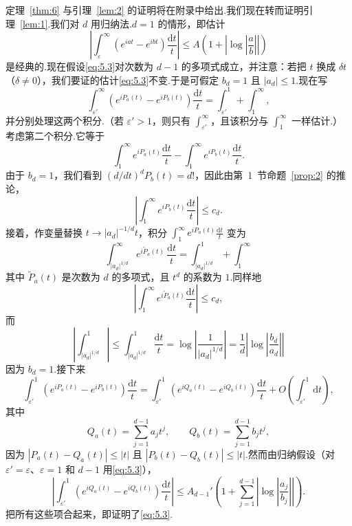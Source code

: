 \documentclass[
  BookTitleCN={傅里叶分析中的振动积分},
  BookTitleEN={Oscillatory Integrals in Fourier Analysis},
  OriginalAuthor={E.~M. Stein},
  OriginalEdition={Proc. Sympos. Pure Math. 35, Part~1},
  OriginalPublisher={American Mathematical Society},
  OriginalYear={1979},
  Translator={翻译及重排},
  ModelUsed={Codex CLI},
  Biblatex=false,
  TranslationDate={2026年8月27日}
]{mathtranslation}
\numberwithin{equation}{chapter}   %
\begin{document}
\noindent 定理~\ref{thm:6} 与引理~\ref{lem:2} 的证明将在附录中给出.我们现在转而证明引理~\ref{lem:1}.我们对 $d$ 用归纳法.$d=1$ 的情形，即估计
\[
  \left|\int_{\varepsilon}^{\infty}\left(e^{iat}-e^{ibt}\right)\frac{\mathrm{d}t}{t}\right|\leq A\left(1+\left|\log\left|\frac{a}{b}\right|\right|\right)
\]
是经典的.现在假设\eqref{eq:5.3}对次数为 $d-1$ 的多项式成立，并注意：若把 $t$ 换成 $\delta t$（$\delta\neq0$），我们要证的估计\eqref{eq:5.3}不变.于是可假定 $b_{d}=1$ 且 $|a_{d}|\leq1$.现在写
\[
  \int_{\varepsilon'}^{\infty}\left(e^{iP_{a}(t)}-e^{iP_{b}(t)}\right)\frac{\mathrm{d}t}{t} = \int_{\varepsilon'}^{1} + \int_{1}^{\infty},
\]
并分别处理这两个积分.（若 $\varepsilon'>1$，则只有 $\int_{\varepsilon'}^{\infty}$，且该积分与 $\int_{1}^{\infty}$ 一样估计.）考虑第二个积分.它等于
\[
  \int_{1}^{\infty}e^{iP_{a}(t)}\frac{\mathrm{d}t}{t} - \int_{1}^{\infty}e^{iP_{b}(t)}\frac{\mathrm{d}t}{t} .
\]
由于 $b_{d}=1$，我们看到 $(d/dt)^{d}P_{b}(t)=d!$，因此由第~1~节命题~\ref{prop:2} 的推论，
\[
  \left|\int_{1}^{\infty}e^{iP_{b}(t)}\frac{\mathrm{d}t}{t}\right|\leq c_{d} .
\]
接着，作变量替换 $t\to|a_{d}|^{-1/d}t$，积分 $\int_{1}^{\infty}e^{iP_{a}(t)}\frac{\mathrm{d}t}{t}$ 变为
\[
  \int_{|a_{d}|^{1/d}}^{\infty}e^{i\widetilde{P}_{a}(t)}\,\frac{\mathrm{d}t}{t} = \int_{|a_{d}|^{1/d}}^{1} + \int_{1}^{\infty}
\]
其中 $\widetilde{P}_{a}(t)$ 是次数为 $d$ 的多项式，且 $t^{d}$ 的系数为 $1$.同样地
\[
  \left|\int_{1}^{\infty}e^{i\widetilde{P}_{a}(t)}\frac{\mathrm{d}t}{t}\right|\leq c_{d},
\]
而
\[
  \left|\int_{|a_{d}|^{1/d}}^{1}\right|\leq\int_{|a_{d}|^{1/d}}^{1}\frac{\mathrm{d}t}{t}=\log\left|\frac{1}{|a_d|^{1/d}}\right|=\frac{1}{d}\left|\log\left|\frac{b_{d}}{a_{d}}\right|\right|
\]
因为 $b_{d}=1$.接下来
\[
  \int_{\varepsilon'}^{1}\left(e^{iP_{a}(t)}-e^{iP_{b}(t)}\right)\frac{\mathrm{d}t}{t} = \int_{\varepsilon'}^{1}\left(e^{iQ_{a}(t)}-e^{iQ_{b}(t)}\right)\frac{\mathrm{d}t}{t} + O\left(\int_{\varepsilon'}^{1}\mathrm{d}t\right),
\]
其中
\[
  Q_{a}(t)=\sum_{j=1}^{d-1}a_{j}t^{j},\qquad Q_{b}(t)=\sum_{j=1}^{d-1}b_{j}t^{j},
\]
因为 $|P_{a}(t)-Q_{a}(t)|\leq|t|$ 且 $|P_{b}(t)-Q_{b}(t)|\leq|t|$.然而由归纳假设（对 $\varepsilon'=\varepsilon$、$\varepsilon=1$ 和 $d-1$ 用\eqref{eq:5.3}），
\[
  \left|\int_{\varepsilon'}^{1}\left(e^{iQ_{a}(t)}-e^{iQ_{b}(t)}\right)\frac{\mathrm{d}t}{t}\right|\leq A_{d-1}'\left(1+\sum_{j=1}^{d-1}\left|\log\left|\frac{a_{j}}{b_{j}}\right|\right|\right).
\]
把所有这些项合起来，即证明了\eqref{eq:5.3}.
\end{document}
